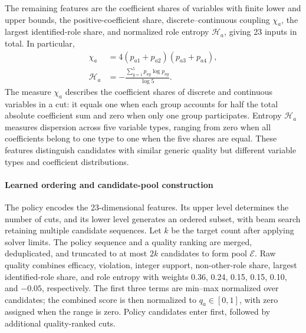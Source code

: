 \documentclass[final,5p,times,twocolumn]{elsarticle}
\begin{document}
The remaining features are the coefficient shares of variables with finite lower and upper bounds, the positive-coefficient share, discrete--continuous coupling $\chi_a$, the largest identified-role share, and normalized role entropy $\mathcal H_a$, giving 23 inputs in total. In particular,
\begin{equation}
\begin{aligned}
\chi_a&=4(p_{a1}+p_{a2})(p_{a3}+p_{a4}),\\
\mathcal H_a&=-\frac{\sum_{g=1}^{5}p_{ag}\log p_{ag}}{\log5}.
\end{aligned}
\label{eq:role-information-cn}
\end{equation}
The measure $\chi_a$ describes the coefficient shares of discrete and continuous variables in a cut: it equals one when each group accounts for half the total absolute coefficient sum and zero when only one group participates. Entropy $\mathcal H_a$ measures dispersion across five variable types, ranging from zero when all coefficients belong to one type to one when the five shares are equal. These features distinguish candidates with similar generic quality but different variable types and coefficient distributions.

\paragraph{Learned ordering and candidate-pool construction}
The policy encodes the 23-dimensional features. Its upper level determines the number of cuts, and its lower level generates an ordered subset, with beam search retaining multiple candidate sequences. Let $k$ be the target count after applying solver limits. The policy sequence and a quality ranking are merged, deduplicated, and truncated to at most $2k$ candidates to form pool $\mathcal E$. Raw quality combines efficacy, violation, integer support, non-other-role share, largest identified-role share, and role entropy with weights 0.36, 0.24, 0.15, 0.15, 0.10, and $-0.05$, respectively. The first three terms are min--max normalized over candidates; the combined score is then normalized to $q_a\in[0,1]$, with zero assigned when the range is zero. Policy candidates enter first, followed by additional quality-ranked cuts.
\end{document}
